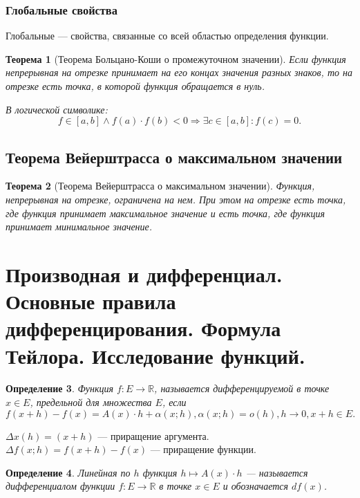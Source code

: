 \documentclass[12pt]{report}
\theoremstyle{plain}
\newtheorem{theorem}{Теорема}[chapter]
\newtheorem{definition}[theorem]{Определение}
\newcommand{\R}{\mathbb R}
\begin{document}
\subsubsection{Глобальные свойства}
Глобальные --- свойства, связанные со всей областью определения функции.

\begin{theorem}[Теорема Больцано-Коши о промежуточном значении]
Если функция непрерывная на отрезке принимает на его концах
значения разных знаков, то на отрезке есть точка, в которой
функция обращается в нуль.

В логической символике:
$$
f \in [a, b] \land f(a) \cdot f(b) < 0 \Rightarrow \exists c \in [a, b]: f(c) = 0.
$$
\end{theorem}

\subsection{Теорема Вейерштрасса о максимальном значении}
\begin{theorem}[Теорема Вейерштрасса о максимальном значении]
Функция, непрерывная на отрезке, ограничена на нем.
При этом на отрезке есть точка, где функция принимает максимальное
значение и есть точка, где функция принимает минимальное значение.
\end{theorem}


\section{Производная и дифференциал. Основные правила дифференцирования. Формула Тейлора. Исследование функций.}

\begin{definition}
Функция $f: E \rightarrow \R$, называется дифференцируемой в точке
$x \in E$, предельной для множества $E$, если
$$
f(x + h) - f(x) = A(x) \cdot h + \alpha(x; h), \alpha(x; h) = o(h), h \rightarrow 0, x + h \in E.
$$ 
\end{definition}

$\Delta x(h) = (x + h)$ --- приращение аргумента.
$\Delta f(x; h) = f(x + h) - f(x)$ --- приращение функции.

\begin{definition}
Линейная по $h$ функция $h \mapsto A(x) \cdot h$ --- называется дифференциалом
функции $f: E \rightarrow \R$ в точке $x \in E$ и обозначается $df(x)$.
\end{definition}
\end{document}
